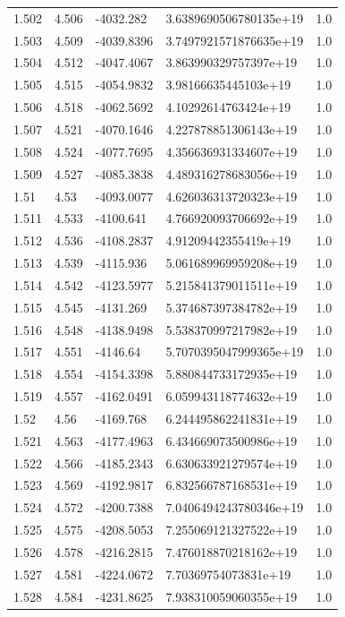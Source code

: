 \begin{tabular}{lllll}
1.502 & 4.506 & -4032.282 & 3.6389690506780135e+19 & 1.0 \\
1.503 & 4.509 & -4039.8396 & 3.7497921571876635e+19 & 1.0 \\
1.504 & 4.512 & -4047.4067 & 3.863990329757397e+19 & 1.0 \\
1.505 & 4.515 & -4054.9832 & 3.98166635445103e+19 & 1.0 \\
1.506 & 4.518 & -4062.5692 & 4.10292614763424e+19 & 1.0 \\
1.507 & 4.521 & -4070.1646 & 4.227878851306143e+19 & 1.0 \\
1.508 & 4.524 & -4077.7695 & 4.356636931334607e+19 & 1.0 \\
1.509 & 4.527 & -4085.3838 & 4.489316278683056e+19 & 1.0 \\
1.51 & 4.53 & -4093.0077 & 4.626036313720323e+19 & 1.0 \\
1.511 & 4.533 & -4100.641 & 4.766920093706692e+19 & 1.0 \\
1.512 & 4.536 & -4108.2837 & 4.91209442355419e+19 & 1.0 \\
1.513 & 4.539 & -4115.936 & 5.061689969959208e+19 & 1.0 \\
1.514 & 4.542 & -4123.5977 & 5.215841379011511e+19 & 1.0 \\
1.515 & 4.545 & -4131.269 & 5.374687397384782e+19 & 1.0 \\
1.516 & 4.548 & -4138.9498 & 5.538370997217982e+19 & 1.0 \\
1.517 & 4.551 & -4146.64 & 5.7070395047999365e+19 & 1.0 \\
1.518 & 4.554 & -4154.3398 & 5.880844733172935e+19 & 1.0 \\
1.519 & 4.557 & -4162.0491 & 6.059943118774632e+19 & 1.0 \\
1.52 & 4.56 & -4169.768 & 6.244495862241831e+19 & 1.0 \\
1.521 & 4.563 & -4177.4963 & 6.434669073500986e+19 & 1.0 \\
1.522 & 4.566 & -4185.2343 & 6.630633921279574e+19 & 1.0 \\
1.523 & 4.569 & -4192.9817 & 6.832566787168531e+19 & 1.0 \\
1.524 & 4.572 & -4200.7388 & 7.0406494243780346e+19 & 1.0 \\
1.525 & 4.575 & -4208.5053 & 7.255069121327522e+19 & 1.0 \\
1.526 & 4.578 & -4216.2815 & 7.476018870218162e+19 & 1.0 \\
1.527 & 4.581 & -4224.0672 & 7.70369754073831e+19 & 1.0 \\
1.528 & 4.584 & -4231.8625 & 7.938310059060355e+19 & 1.0 \\

\end{tabular}
